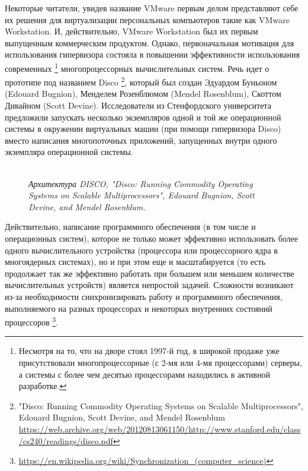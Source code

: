 \documentclass[14pt, a4paper]{article}
\begin{document}
Некоторые читатели, увидев название VMware первым делом представляют себе их
решения для виртуализации персональных компьютеров такие как VMware
Workstation. И, действительно, VMware Workstation был их первым выпущенным
коммерческим продуктом. Однако, первоначальная мотивация для использования
гипервизора состояла в повышении эффективности использования современных \footnote{Несмотря на то, что на дворе стоял 1997-й год, в широкой продаже уже присутствовали
многопроцессорные (с 2-мя или 4-мя процессорами) серверы, а системы с более чем десятью
процессорами находились в активной разработке.}
многопроцессорных вычислительных систем. Речь идет о прототипе под названием
Disco \footnote{"Disco: Running Commodity Operating Systems on Scalable Multiprocessors",
Edouard Bugnion, Scott Devine, and Mendel Rosenblum \\ \href{https://web.archive.org/web/20120813061150/http://www.stanford.edu/class/cs240/readings/disco.pdf}{https://web.archive.org/web/20120813061150/http://www.stanford.edu/class/cs240/readings/disco.pdf}}, который был создан Эдуардом Буньоном (Edouard Bugnion), Менделем
Розенблюмом (Mendel Rosenblum), Скоттом Дивайном (Scott Devine). Исследователи из
Стенфордского университета предложили запускать несколько экземпляров одной и
той же операционной системы в окружении виртуальных машин (при помощи
гипервизора Disco) вместо написания многопоточных приложений, запущенных внутри
одного экземпляра операционной системы.

\begin{figure}[h]
    \centering
    \\
    \small\textit{Архитектура DISCO, "Disco: Running Commodity Operating Systems on Scalable Multiprocessors",
    Edouard Bugnion, Scott Devine, and Mendel Rosenblum.}
    \label{framework} 
\end{figure}

Действительно, написание программного обеспечения (в том числе и операционных
систем), которое не только может эффективно использовать более одного
вычислительного устройства (процессора или процессорного ядра в многоядерных
системах), но и при этом еще и масштабируется (то есть продолжает так же
эффективно работать при большем или меньшем количестве вычислительных
устройств) является непростой задачей. Сложности возникают из-за необходимости
синхронизировать работу и программного обеспечения, выполняемого на разных
процессорах и некоторых внутренних состояний процессоров \footnote{\href{https://en.wikipedia.org/wiki/Synchronization_(computer_science)}{https://en.wikipedia.org/wiki/Synchronization\_(computer\_science)}}.\\
\end{document}
